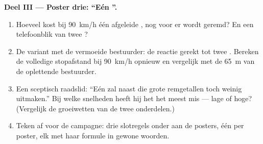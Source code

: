 \begin{problem}
\medskip\noindent\textbf{Deel III --- Poster drie: ``Eén ''.}
\begin{enumerate}[resume]
  \item Hoeveel  kost bij \qty{90}{km/h} één afgeleide
        , nog voor er wordt geremd? En een telefoonblik van twee
        ?
  \item De variant met de vermoeide bestuurder: de reactie gerekt tot
        twee . Bereken de volledige stopafstand bij
        \qty{90}{km/h} opnieuw en vergelijk met de \qty{65}{m} van de
        oplettende bestuurder.
  \item Een sceptisch raadslid: ``Eén  zal naast die grote
        remgetallen toch weinig uitmaken.'' Bij welke
        snelheden heeft hij het het meest mis --- lage of hoge?
        (Vergelijk de groeiwetten van de twee onderdelen.)
  \item Teken af voor de campagne: drie slotregels onder aan de
        posters, één per poster, elk met haar formule in gewone
        woorden.
\end{enumerate}
\end{problem}
